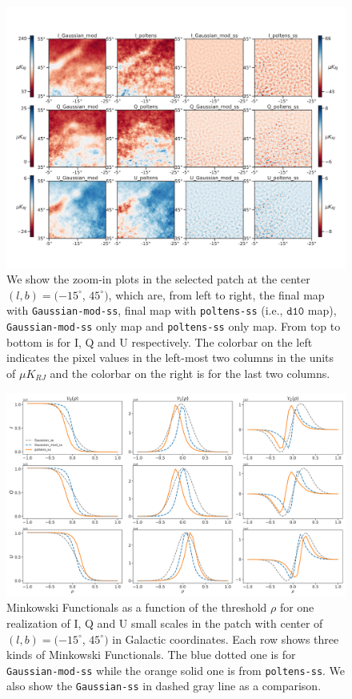 \documentclass[twocolumn]{aastex631}
\begin{document}
\begin{figure}
    \centering
    \includegraphics[width=180mm]{figures/maps_patch_345_45.pdf}
    \caption{We show the zoom-in plots in the selected patch at the center $(l, b) = (-15^{\circ}$, $45^{\circ})$, which are, from left to right, the final map with \texttt{Gaussian-mod-ss}, final map with \texttt{poltens-ss} (i.e., $\texttt{d10}$ map), \texttt{Gaussian-mod-ss} only map and \texttt{poltens-ss} only map. From top to bottom is for I, Q and U respectively. The colorbar on the left indicates the pixel values in the left-most two columns in the units of $\mu K_{RJ}$ and the colorbar on the right is for the last two columns. }
    \label{fig:maps:patch2}
\end{figure}

\begin{figure}
    \centering
    \includegraphics[width=180mm]{figures/MFs_345_45_with_G_rescaled.pdf}
    \caption{Minkowski Functionals as a function of the threshold $\rho$ for one realization of I, Q and U small scales in the patch with center of $(l, b) = (-15^{\circ}$, $45^{\circ})$ in Galactic coordinates. Each row shows three kinds of Minkowski Functionals. The blue dotted one is for \texttt{Gaussian-mod-ss} while the orange solid one is from \texttt{poltens-ss}. We also show the \texttt{Gaussian-ss} in dashed gray line as a comparison.}
    \label{fig:MF:patch2}
\end{figure}
\end{document}
